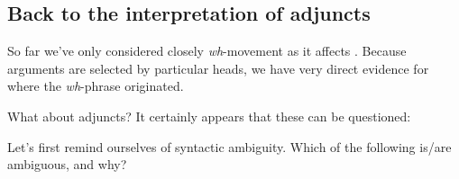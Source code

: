 \documentclass{article}
\begin{document}
\subsection{Back to the interpretation of adjuncts}

So far we've only considered closely \emph{wh}-movement as it affects .
Because arguments are selected by particular heads, we have very direct evidence for where the \emph{wh}-phrase originated.   

What about adjuncts?  It certainly appears that these can be questioned:
\begin{exe}
\end{exe}

Let's first remind ourselves of syntactic ambiguity. Which of the following is/are ambiguous, and why?
\begin{exe}
\end{exe}
\end{document}
